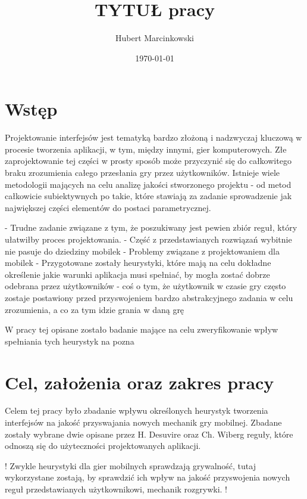 \documentclass[a4paper,12pt,numbers=noenddot]{report}
\title{TYTUŁ pracy}
\date{\today}
\author{Hubert Marcinkowski}
\begin{document}
	\nocite{*}
	

	\newpage
	\tableofcontents
	\newpage
	
\chapter{Wstęp}
Projektowanie interfejsów jest tematyką bardzo złożoną i nadzwyczaj kluczową w procesie tworzenia aplikacji, w tym, między innymi, gier komputerowych. Złe zaprojektowanie tej części w prosty sposób może przyczynić się do całkowitego braku zrozumienia całego przesłania gry przez użytkowników. Istnieje wiele metodologii mających na celu analizę jakości stworzonego projektu - od metod całkowicie subiektywnych po takie, które stawiają za zadanie sprowadzenie jak największej części elementów do postaci parametrycznej. 

- Trudne zadanie związane z tym, że poszukiwany jest pewien zbiór reguł, który ułatwiłby proces projektowania. 
- Część z przedstawianych rozwiązań wybitnie nie pasuje do dziedziny mobilek
- Problemy związane z projektowaniem dla mobilek
- Przygotowane zostały heurystyki, które mają na celu dokładne określenie jakie warunki aplikacja musi spełniać, by mogła zostać dobrze odebrana przez użytkowników
- coś o tym, że użytkownik w czasie gry często zostaje postawiony przed przyswojeniem bardzo abstrakcyjnego zadania w celu zrozumienia, a co za tym idzie grania w daną grę

W pracy tej opisane zostało badanie mające na celu zweryfikowanie wpływ spełniania tych heurystyk na pozna

\chapter{Cel, założenia oraz zakres pracy}
Celem tej pracy było zbadanie wpływu określonych heurystyk tworzenia interfejsów na jakość przyswajania nowych mechanik gry mobilnej. Zbadane zostały wybrane dwie opisane przez H. Desuvire oraz Ch. Wiberg \cite{ArticlePLAY} reguły, które odnoszą się do użyteczności projektowanych aplikacji.

!
Zwykle heurystyki dla gier mobilnych sprawdzają grywalność, tutaj wykorzystane zostają, by sprawdzić ich wpływ na jakość przyswojenia nowych reguł przedstawianych użytkownikowi, mechanik rozgrywki.
!
\end{document}
